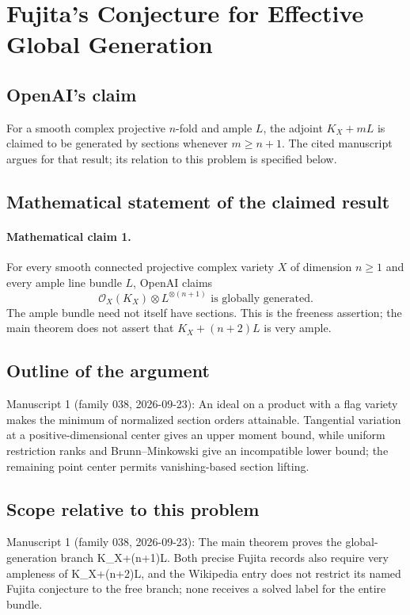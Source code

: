 \documentclass[11pt]{article}
\begin{document}
\section*{Fujita's Conjecture for Effective Global Generation}

\subsection{OpenAI's claim}
For a smooth complex projective $n$-fold and ample $L$, the adjoint $K_X+mL$ is claimed to be generated by sections whenever $m\ge n+1$. The cited manuscript argues for that result; its relation to this problem is specified below.

\subsection{Mathematical statement of the claimed result}
\paragraph{Mathematical claim 1.} For every smooth connected projective complex variety $X$ of dimension $n\ge1$ and every ample line bundle $L$, OpenAI claims
\[
\mathcal O_X(K_X)\otimes L^{\otimes(n+1)}\text{ is globally generated}.
\]
The ample bundle need not itself have sections. This is the freeness assertion; the main theorem does not assert that $K_X+(n+2)L$ is very ample.

\subsection{Outline of the argument}
Manuscript 1 (family 038, 2026-09-23): An ideal on a product with a flag variety makes the minimum of normalized section orders attainable. Tangential variation at a positive-dimensional center gives an upper moment bound, while uniform restriction ranks and Brunn--Minkowski give an incompatible lower bound; the remaining point center permits vanishing-based section lifting.

\subsection{Scope relative to this problem}
Manuscript 1 (family 038, 2026-09-23): The main theorem proves the global-generation branch K\_X+(n+1)L. Both precise Fujita records also require very ampleness of K\_X+(n+2)L, and the Wikipedia entry does not restrict its named Fujita conjecture to the free branch; none receives a solved label for the entire bundle.
\end{document}
